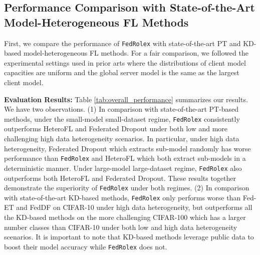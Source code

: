 \documentclass{article}
\begin{document}
\subsection{Performance Comparison with State-of-the-Art Model-Heterogeneous FL Methods}
\label{sec:heterogeneous}
%

First, we compare the performance of \texttt{FedRolex} with state-of-the-art PT and KD-based model-heterogeneous FL methods.
%
For a fair comparison, we followed the  experimental settings used in prior arts where the distributions of client model capacities are uniform and the global server model is the same as the largest client model.

%
\textbf{Evaluation Results:} Table \ref{tab:overall_performance} summarizes our results. We have two observations.
%
(1) In comparison with state-of-the-art PT-based methods, under the small-model small-dataset regime, \texttt{FedRolex} consistently outperforms HeteroFL and Federated Dropout under both low and more challenging high data heterogeneity scenarios. In particular, under high data heterogeneity, Federated Dropout which extracts sub-model randomly has worse performance than \texttt{FedRolex} and HeteroFL which both extract sub-models in a deterministic manner.
%
Under large-model large-dataset regime, \texttt{FedRolex} also outperforms both HeteroFL and Federated Dropout. These results together demonstrate the superiority of \texttt{FedRolex} under both regimes. 
%
(2) In comparison with state-of-the-art KD-based methods, \texttt{FedRolex} only performs worse than Fed-ET and FedDF on CIFAR-10 under high data heterogeneity, but outperforms all the KD-based methods on the more challenging CIFAR-100 which has a larger number classes than CIFAR-10 under both low and high data heterogeneity scenarios. It is important to note that KD-based methods leverage public data to boost their model accuracy while \texttt{FedRolex} does not. 
%
\end{document}

